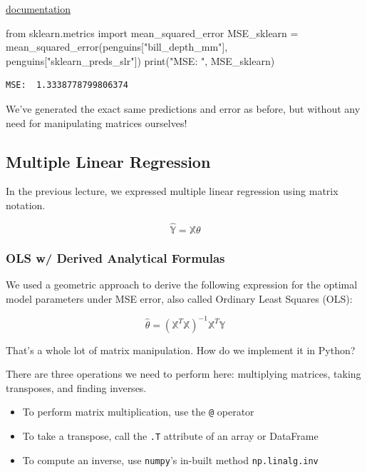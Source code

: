 \documentclass[
  letterpaper,
  DIV=11,
  numbers=noendperiod]{scrreprt}
\newenvironment{Shaded}{\begin{snugshade}}{\end{snugshade}}
\newcommand{\BuiltInTok}[1]{\textcolor[rgb]{0.00,0.23,0.31}{#1}}
\newcommand{\ImportTok}[1]{\textcolor[rgb]{0.00,0.46,0.62}{#1}}
\newcommand{\NormalTok}[1]{\textcolor[rgb]{0.00,0.23,0.31}{#1}}
\newcommand{\OperatorTok}[1]{\textcolor[rgb]{0.37,0.37,0.37}{#1}}
\newcommand{\StringTok}[1]{\textcolor[rgb]{0.13,0.47,0.30}{#1}}
\providecommand{\tightlist}{%
  \setlength{\itemsep}{0pt}\setlength{\parskip}{0pt}}\usepackage{longtable,booktabs,array}
\begin{document}
\href{https://scikit-learn.org/stable/modules/generated/sklearn.metrics.mean_squared_error.html}{documentation}

\begin{Shaded}
\begin{Highlighting}[]
\ImportTok{from}\NormalTok{ sklearn.metrics }\ImportTok{import}\NormalTok{ mean\_squared\_error}
\NormalTok{MSE\_sklearn }\OperatorTok{=}\NormalTok{ mean\_squared\_error(penguins[}\StringTok{"bill\_depth\_mm"}\NormalTok{], penguins[}\StringTok{"sklearn\_preds\_slr"}\NormalTok{])}
\BuiltInTok{print}\NormalTok{(}\StringTok{"MSE: "}\NormalTok{, MSE\_sklearn)}
\end{Highlighting}
\end{Shaded}

\begin{verbatim}
MSE:  1.3338778799806374
\end{verbatim}

We've generated the exact same predictions and error as before, but
without any need for manipulating matrices ourselves!

\hypertarget{multiple-linear-regression-1}{%
\subsection{Multiple Linear
Regression}\label{multiple-linear-regression-1}}

In the previous lecture, we expressed multiple linear regression using
matrix notation.

\[\hat{\mathbb{Y}} = \mathbb{X}\theta\]

\hypertarget{ols-w-derived-analytical-formulas}{%
\subsubsection{OLS w/ Derived Analytical
Formulas}\label{ols-w-derived-analytical-formulas}}

We used a geometric approach to derive the following expression for the
optimal model parameters under MSE error, also called Ordinary Least
Squares (OLS):

\[\hat{\theta} = (\mathbb{X}^T \mathbb{X})^{-1}\mathbb{X}^T \mathbb{Y}\]

That's a whole lot of matrix manipulation. How do we implement it in
Python?

There are three operations we need to perform here: multiplying
matrices, taking transposes, and finding inverses.

\begin{itemize}
\tightlist
\item
  To perform matrix multiplication, use the \texttt{@} operator
\item
  To take a transpose, call the \texttt{.T} attribute of an array or
  DataFrame
\item
  To compute an inverse, use \texttt{numpy}'s in-built method
  \texttt{np.linalg.inv}
\end{itemize}
\end{document}
